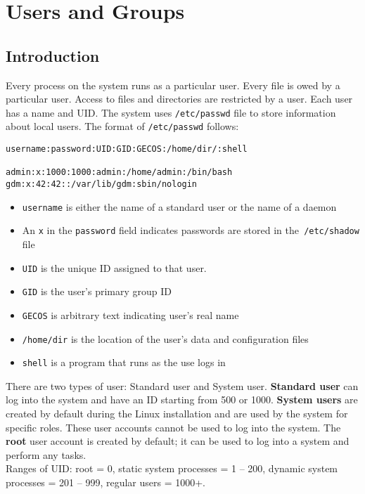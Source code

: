 \chapter{Users and Groups}

\section{Introduction}

Every process on the system runs as a particular user. Every file is owed by a particular user. Access to files and directories are restricted by a user. Each user has a name and UID. The system uses \verb|/etc/passwd| file to store information about local users. The format of \verb|/etc/passwd| follows: 

\begin{verbatim}
username:password:UID:GID:GECOS:/home/dir/:shell

admin:x:1000:1000:admin:/home/admin:/bin/bash
gdm:x:42:42::/var/lib/gdm:sbin/nologin
\end{verbatim}

\begin{itemize}
\item \verb|username| is either the name of a standard user or the name of a daemon
\item An \verb|x| in the \verb|password| field indicates passwords are stored in the\verb| /etc/shadow| file
\item \verb|UID| is the unique ID assigned to that user.
\item \verb|GID| is the user's primary group ID
\item \verb|GECOS| is arbitrary text indicating user's real name
\item \verb|/home/dir| is the location of the user's data and configuration files
\item \verb|shell| is a program that runs as the use logs in
\end{itemize}

There are two types of user: Standard user and System user. \textbf{Standard user} can log into the system and have an ID starting from 500 or 1000. \textbf{System users} are created by default during the Linux installation and are used by the system for specific roles. These user accounts cannot be used to log into the system. The \textbf{root} user account is created by default; it can be used to log into a system and perform any tasks.\\

Ranges of UID: root = 0, static system processes = 1 -- 200, dynamic system processes = 201 -- 999, regular users = 1000+.\\


